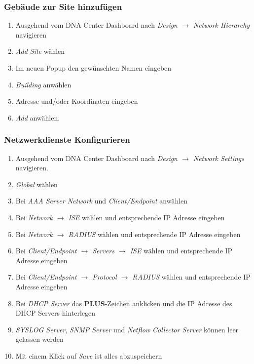 \subsubsection{Gebäude zur Site hinzufügen}
\begin{enumerate}
	\item Ausgehend vom DNA Center Dashboard nach \textit{Design $\rightarrow$ Network Hierarchy} navigieren
	\item \textit{Add Site} wählen
	\item Im neuen Popup den gewünschten Namen eingeben
	\item \textit{Building} anwählen
	\item Adresse und/oder Koordinaten eingeben
	\item \textit{Add} anwählen.
\end{enumerate}


\subsubsection{Netzwerkdienste Konfigurieren}
\begin{enumerate}
	\item Ausgehend vom DNA Center Dashboard nach \textit{Design $\rightarrow$ Network Settings} navigieren. 
	\item \textit{Global} wählen
	\item Bei \textit{AAA Server Network} und \textit{Client/Endpoint} anwählen
	\item Bei \textit{Network $\rightarrow$ ISE} wählen und entsprechende IP Adresse eingeben
	\item Bei \textit{Network $\rightarrow$ RADIUS} wählen und entsprechende IP Adresse eingeben
	\item Bei \textit{Client/Endpoint $\rightarrow$ Servers $\rightarrow$ ISE} wählen und entsprechende IP Adresse eingeben
	\item Bei \textit{Client/Endpoint $\rightarrow$ Protocol $\rightarrow$ RADIUS} wählen und entsprechende IP Adresse eingeben
	\item Bei \textit{DHCP Server} das \textbf{PLUS}-Zeichen anklicken und die IP Adresse des DHCP Servers hinterlegen 
	\item \textit{SYSLOG Server}, \textit{SNMP Server} und \textit{Netflow Collector Server} können leer gelassen werden
	\item Mit einem Klick auf \textit{Save} ist alles abzuspeichern
\end{enumerate}

